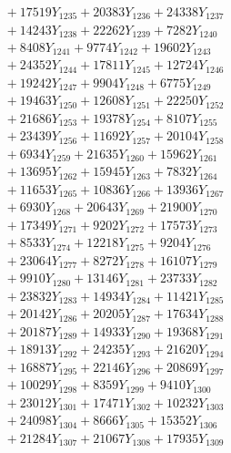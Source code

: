 \documentclass[a4paper,10pt]{article}
\begin{document}
{\begin{align}
&\;  + 17519 Y_{1235} + 20383 Y_{1236} + 24338 Y_{1237} \\[0.3ex]
&\;  + 14243 Y_{1238} + 22262 Y_{1239} + 7282 Y_{1240} \\[0.3ex]
&\;  + 8408 Y_{1241} + 9774 Y_{1242} + 19602 Y_{1243} \\[0.3ex]
&\;  + 24352 Y_{1244} + 17811 Y_{1245} + 12724 Y_{1246} \\[0.3ex]
&\;  + 19242 Y_{1247} + 9904 Y_{1248} + 6775 Y_{1249} \\[0.3ex]
&\;  + 19463 Y_{1250} + 12608 Y_{1251} + 22250 Y_{1252} \\[0.3ex]
&\;  + 21686 Y_{1253} + 19378 Y_{1254} + 8107 Y_{1255} \\[0.3ex]
&\;  + 23439 Y_{1256} + 11692 Y_{1257} + 20104 Y_{1258} \\[0.5ex]\allowbreak
&\;  + 6934 Y_{1259} + 21635 Y_{1260} + 15962 Y_{1261} \\[0.3ex]
&\;  + 13695 Y_{1262} + 15945 Y_{1263} + 7832 Y_{1264} \\[0.3ex]
&\;  + 11653 Y_{1265} + 10836 Y_{1266} + 13936 Y_{1267} \\[0.3ex]
&\;  + 6930 Y_{1268} + 20643 Y_{1269} + 21900 Y_{1270} \\[0.3ex]
&\;  + 17349 Y_{1271} + 9202 Y_{1272} + 17573 Y_{1273} \\[0.3ex]
&\;  + 8533 Y_{1274} + 12218 Y_{1275} + 9204 Y_{1276} \\[0.3ex]
&\;  + 23064 Y_{1277} + 8272 Y_{1278} + 16107 Y_{1279} \\[0.3ex]
&\;  + 9910 Y_{1280} + 13146 Y_{1281} + 23733 Y_{1282} \\[0.3ex]
&\;  + 23832 Y_{1283} + 14934 Y_{1284} + 11421 Y_{1285} \\[0.3ex]
&\;  + 20142 Y_{1286} + 20205 Y_{1287} + 17634 Y_{1288} \\[0.5ex]\allowbreak
&\;  + 20187 Y_{1289} + 14933 Y_{1290} + 19368 Y_{1291} \\[0.3ex]
&\;  + 18913 Y_{1292} + 24235 Y_{1293} + 21620 Y_{1294} \\[0.3ex]
&\;  + 16887 Y_{1295} + 22146 Y_{1296} + 20869 Y_{1297} \\[0.3ex]
&\;  + 10029 Y_{1298} + 8359 Y_{1299} + 9410 Y_{1300} \\[0.3ex]
&\;  + 23012 Y_{1301} + 17471 Y_{1302} + 10232 Y_{1303} \\[0.3ex]
&\;  + 24098 Y_{1304} + 8666 Y_{1305} + 15352 Y_{1306} \\[0.3ex]
&\;  + 21284 Y_{1307} + 21067 Y_{1308} + 17935 Y_{1309} \\[0.3ex]

\end{align}}
\end{document}
